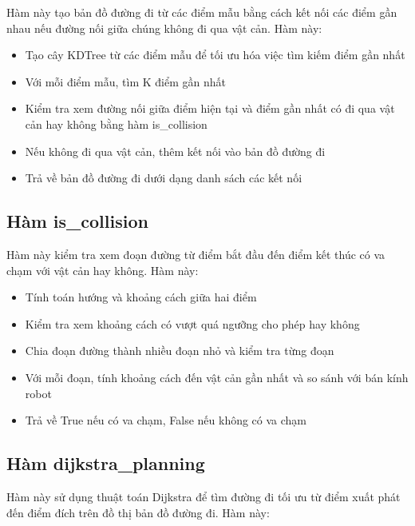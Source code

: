 \documentclass[12pt,a4paper,openany,oneside]{report}
\begin{document}
Hàm này tạo bản đồ đường đi từ các điểm mẫu bằng cách kết nối các điểm gần nhau nếu đường nối giữa chúng không đi qua vật cản. Hàm này:

\begin{itemize}
    \item Tạo cây KDTree từ các điểm mẫu để tối ưu hóa việc tìm kiếm điểm gần nhất
    \item Với mỗi điểm mẫu, tìm K điểm gần nhất
    \item Kiểm tra xem đường nối giữa điểm hiện tại và điểm gần nhất có đi qua vật cản hay không bằng hàm is\_collision
    \item Nếu không đi qua vật cản, thêm kết nối vào bản đồ đường đi
    \item Trả về bản đồ đường đi dưới dạng danh sách các kết nối
\end{itemize}

\subsection{Hàm is\_collision}

Hàm này kiểm tra xem đoạn đường từ điểm bắt đầu đến điểm kết thúc có va chạm với vật cản hay không. Hàm này:

\begin{itemize}
    \item Tính toán hướng và khoảng cách giữa hai điểm
    \item Kiểm tra xem khoảng cách có vượt quá ngưỡng cho phép hay không
    \item Chia đoạn đường thành nhiều đoạn nhỏ và kiểm tra từng đoạn
    \item Với mỗi đoạn, tính khoảng cách đến vật cản gần nhất và so sánh với bán kính robot
    \item Trả về True nếu có va chạm, False nếu không có va chạm
\end{itemize}

\subsection{Hàm dijkstra\_planning}

Hàm này sử dụng thuật toán Dijkstra để tìm đường đi tối ưu từ điểm xuất phát đến điểm đích trên đồ thị bản đồ đường đi. Hàm này:
\end{document}

